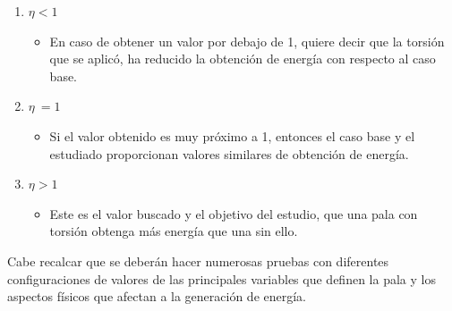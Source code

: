 \begin{enumerate}
    \item $\eta < 1$
        \begin{itemize}
            \item En caso de obtener un valor por debajo de 1, quiere decir que la torsión que se aplicó, ha reducido la obtención de energía con respecto al caso base. 
        \end{itemize}
    \item $\eta ~= 1$
        \begin{itemize}
            \item Si el valor obtenido es muy próximo a 1, entonces el caso base y el estudiado proporcionan valores similares de obtención de energía.
        \end{itemize}
    \item $\eta > 1$
        \begin{itemize}
            \item Este es el valor buscado y el objetivo del estudio, que una pala con torsión obtenga más energía que una sin ello.
        \end{itemize}
\end{enumerate}

Cabe recalcar que se deberán hacer numerosas pruebas con diferentes configuraciones de valores de las principales variables que definen la pala y los aspectos físicos que afectan a la generación de energía.